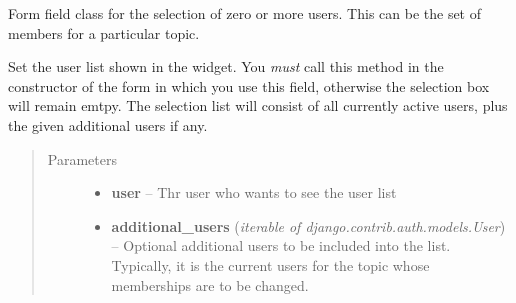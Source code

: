\documentclass[a4paper,11pt,english]{sphinxmanual}
\begin{document}
\begin{fulllineitems}
\label{programming/utilities:jb_common.utils.views.MultipleUsersField}
Form field class for the selection of zero or more users.  This can be
the set of members for a particular topic.

\begin{fulllineitems}
\label{programming/utilities:jb_common.utils.views.MultipleUsersField.set_users}
Set the user list shown in the widget.  You \emph{must} call this method
in the constructor of the form in which you use this field, otherwise
the selection box will remain emtpy.  The selection list will consist
of all currently active users, plus the given additional users if any.
\begin{quote}\begin{description}
\item[{Parameters}] \leavevmode\begin{itemize}
\item {} 
\textbf{user} -- Thr user who wants to see the user list

\item {} 
\textbf{additional\_users} (\emph{iterable of django.contrib.auth.models.User}) -- Optional additional users to be included into
the list.  Typically, it is the current users for the topic whose
memberships are to be changed.

\end{itemize}

\end{description}\end{quote}

\end{fulllineitems}


\end{fulllineitems}

\end{document}
